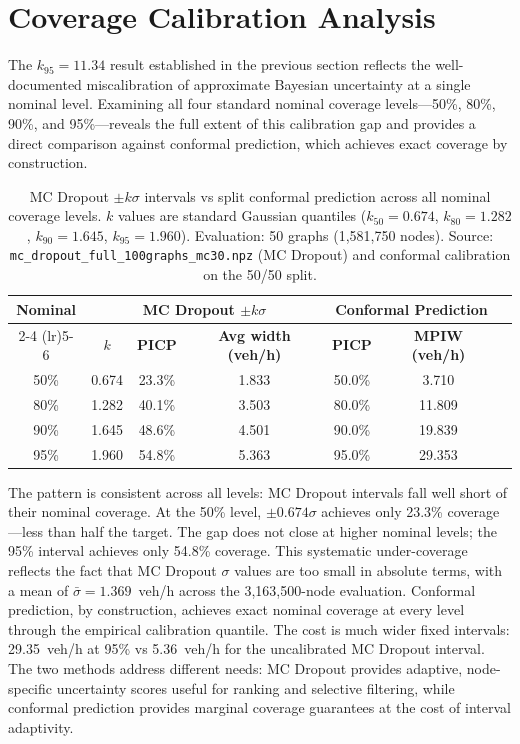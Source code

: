 \section{Coverage Calibration Analysis}
\label{sec:coverage_calibration}

The $k_{95} = 11.34$ result established in the previous section reflects the well-documented miscalibration of approximate Bayesian uncertainty at a single nominal level. Examining all four standard nominal coverage levels---50\%, 80\%, 90\%, and 95\%---reveals the full extent of this calibration gap and provides a direct comparison against conformal prediction, which achieves exact coverage by construction.

\begin{table}[htbp]
\centering
\caption[MC Dropout vs conformal prediction coverage across all nominal levels]{MC Dropout $\pm k\sigma$ intervals vs split conformal prediction across all nominal coverage levels. $k$ values are standard Gaussian quantiles ($k_{50}=0.674$, $k_{80}=1.282$, $k_{90}=1.645$, $k_{95}=1.960$). Evaluation: 50 graphs (1,581,750 nodes). Source: \texttt{mc\_dropout\_full\_100graphs\_mc30.npz} (MC Dropout) and conformal calibration on the 50/50 split.}
\label{tab:coverage_calibration}
\begin{tabular}{ccccccc}
\toprule
\multirow{2}{*}{\textbf{Nominal}} & \multicolumn{3}{c}{\textbf{MC Dropout $\pm k\sigma$}} & \multicolumn{2}{c}{\textbf{Conformal Prediction}} \\
\cmidrule(lr){2-4} \cmidrule(lr){5-6}
 & $k$ & \textbf{PICP} & \textbf{Avg width (veh/h)} & \textbf{PICP} & \textbf{MPIW (veh/h)} \\
\midrule
50\% & 0.674 & 23.3\% & 1.833 & 50.0\% & 3.710 \\
80\% & 1.282 & 40.1\% & 3.503 & 80.0\% & 11.809 \\
90\% & 1.645 & 48.6\% & 4.501 & 90.0\% & 19.839 \\
95\% & 1.960 & 54.8\% & 5.363 & 95.0\% & 29.353 \\
\bottomrule
\end{tabular}
\end{table}

The pattern is consistent across all levels: MC Dropout intervals fall well short of their nominal coverage. At the 50\% level, $\pm 0.674\sigma$ achieves only 23.3\% coverage---less than half the target. The gap does not close at higher nominal levels; the 95\% interval achieves only 54.8\% coverage. This systematic under-coverage reflects the fact that MC Dropout $\sigma$ values are too small in absolute terms, with a mean of $\bar{\sigma} = 1.369$~veh/h across the 3,163,500-node evaluation. Conformal prediction, by construction, achieves exact nominal coverage at every level through the empirical calibration quantile. The cost is much wider fixed intervals: 29.35~veh/h at 95\% vs 5.36~veh/h for the uncalibrated MC Dropout interval. The two methods address different needs: MC Dropout provides adaptive, node-specific uncertainty scores useful for ranking and selective filtering, while conformal prediction provides marginal coverage guarantees at the cost of interval adaptivity.

